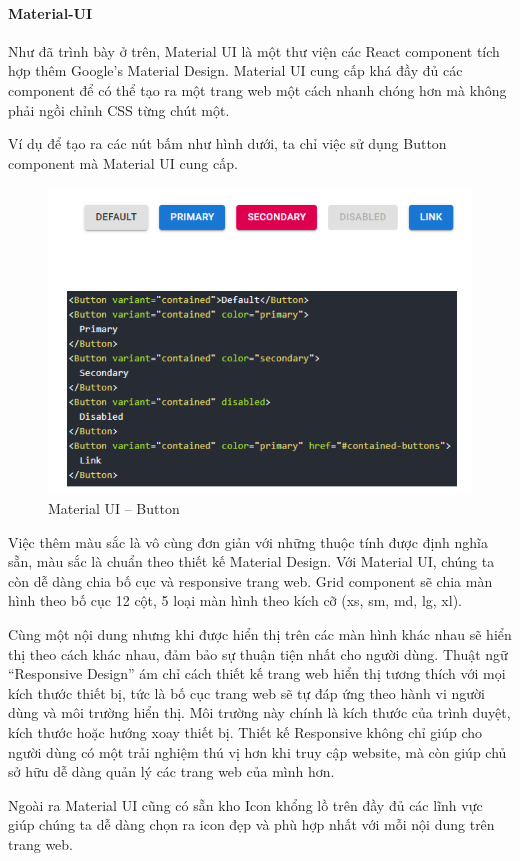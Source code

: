 \paragraph{Material-UI}
Như đã trình bày ở trên, Material UI là một thư viện các
React component tích hợp thêm Google’s Material Design.
Material UI cung cấp khá đầy đủ các component để có thể tạo
ra một trang web một cách nhanh chóng hơn mà không phải ngồi
chỉnh CSS từng chút một.

Ví dụ để tạo ra các nút bấm như hình dưới,
ta chỉ việc sử dụng Button component mà Material UI cung cấp.
\begin{figure}[H]
\centering
\includegraphics[width=14cm]{images/material-ui-button.png}
\caption{Material UI – Button}
\end{figure}

Việc thêm màu sắc là vô cùng đơn giản với những thuộc
tính được định nghĩa sẵn, màu sắc là chuẩn theo thiết
kế Material Design. 
Với Material UI, chúng ta còn dễ dàng chia bố cục và
responsive trang web. Grid component sẽ chia màn hình theo
bố cục 12 cột, 5 loại màn hình theo
kích cỡ (xs, sm, md, lg, xl).

Cùng một nội dung nhưng khi được hiển thị trên các màn
hình khác nhau sẽ hiển thị theo cách khác nhau, đảm bảo sự thuận
tiện nhất cho người dùng.  Thuật ngữ “Responsive Design” ám
chỉ cách thiết kế trang web hiển thị tương thích với mọi kích thước
thiết bị, tức là bố cục trang web sẽ tự đáp ứng theo hành vi
người dùng và môi trường hiển thị. Môi trường này chính là kích thước
của trình duyệt, kích thước hoặc hướng xoay thiết bị. Thiết
kế Responsive không chỉ giúp cho người dùng có một trải nghiệm thú
vị hơn khi truy cập website, mà còn giúp chủ sở hữu dễ dàng
quản lý các trang web của mình hơn.

Ngoài ra Material UI cũng có sẵn kho Icon khổng lồ trên đầy
đủ các lĩnh vực giúp chúng ta dễ dàng chọn ra icon đẹp và
phù hợp nhất với mỗi nội dung trên trang web.

